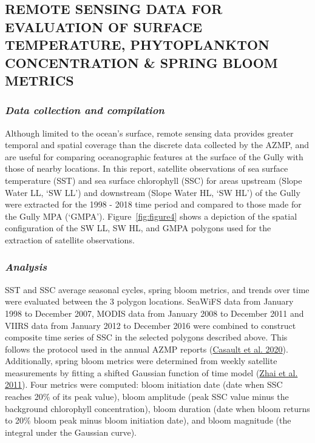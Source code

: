 \documentclass[12pt]{article}\usepackage[]{graphicx}\usepackage[]{color}
\begin{document}
\hypertarget{remote-sensing-data-for-evaluation-of-surface-temperature-phytoplankton-concentration-spring-bloom-metrics}{%
\subsection{\texorpdfstring{\textbf{REMOTE SENSING DATA FOR EVALUATION OF SURFACE TEMPERATURE, PHYTOPLANKTON CONCENTRATION \& SPRING BLOOM METRICS}}{REMOTE SENSING DATA FOR EVALUATION OF SURFACE TEMPERATURE, PHYTOPLANKTON CONCENTRATION \& SPRING BLOOM METRICS}}\label{remote-sensing-data-for-evaluation-of-surface-temperature-phytoplankton-concentration-spring-bloom-metrics}}

\hypertarget{data-collection-and-compilation-3}{%
\subsubsection{\texorpdfstring{\emph{Data collection and compilation}}{Data collection and compilation}}\label{data-collection-and-compilation-3}}

Although limited to the ocean's surface, remote sensing data provides greater temporal and spatial coverage than the discrete data collected by the AZMP, and are useful for comparing oceanographic features at the surface of the Gully with those of nearby locations. In this report, satellite observations of sea surface temperature (SST) and sea surface chlorophyll (SSC) for areas upstream (Slope Water LL, `SW LL') and downstream (Slope Water HL, `SW HL') of the Gully were extracted for the 1998 - 2018 time period and compared to those made for the Gully MPA (`GMPA'). Figure~\ref{fig:figure4} shows a depiction of the spatial configuration of the SW LL, SW HL, and GMPA polygons used for the extraction of satellite observations.

\hypertarget{analysis-3}{%
\subsubsection{\texorpdfstring{\emph{Analysis}}{Analysis}}\label{analysis-3}}

SST and SSC average seasonal cycles, spring bloom metrics, and trends over time were evaluated between the 3 polygon locations. SeaWiFS data from January 1998 to December 2007, MODIS data from January 2008 to December 2011 and VIIRS data from January 2012 to December 2016 were combined to construct composite time series of SSC in the selected polygons described above. This follows the protocol used in the annual AZMP reports (\protect\hyperlink{ref-casault_2020}{Casault et al. 2020}). Additionally, spring bloom metrics were determined from weekly satellite measurements by fitting a shifted Gaussian function of time model (\protect\hyperlink{ref-zhai_2011}{Zhai et al. 2011}). Four metrics were computed: bloom initiation date (date when SSC reaches 20\% of its peak value), bloom amplitude (peak SSC value minus the background chlorophyll concentration), bloom duration (date when bloom returns to 20\% bloom peak minus bloom initiation date), and bloom magnitude (the integral under the Gaussian curve).
\end{document}
